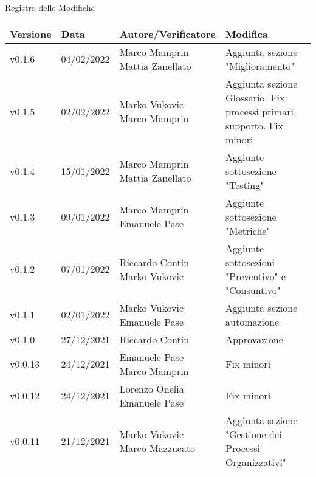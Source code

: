 \begin{center}
  \huge{Registro delle Modifiche}
\end{center}
\newcommand{\aCapo}[1]{%
  \begin{tabular}{@{}c@{}}\strut#1\strut\end{tabular}%
}

\begin{center}
  \begin{longtable}{|p{1.8cm}|p{2.2cm}|p{4.2cm}|p{4.6cm}|}
      \hline
      \textbf{Versione} & \textbf{Data} & \textbf{Autore/Verificatore} & \textbf{Modifica}                    \\ \hline
      v0.1.6            & 04/02/2022    & \aCapo{Marco Mamprin\\Mattia Zanellato} & Aggiunta sezione "Miglioramento"   \\ \hline          
      v0.1.5            & 02/02/2022    & \aCapo{Marko Vukovic\\Marco Mamprin} & Aggiunta sezione Glossario. Fix: processi primari, supporto. Fix minori   \\ \hline           
      v0.1.4            & 15/01/2022    & \aCapo{Marco Mamprin\\Mattia Zanellato} & Aggiunte sottosezione "Testing"  \\ \hline 
      v0.1.3            & 09/01/2022    & \aCapo{Marco Mamprin\\Emanuele Pase} & Aggiunte sottosezione "Metriche"  \\ \hline           
      v0.1.2            & 07/01/2022    & \aCapo{Riccardo Contin\\Marko Vukovic} & Aggiunte sottosezioni "Preventivo" e "Consuntivo"  \\ \hline
      v0.1.1            & 02/01/2022    & \aCapo{Marko Vukovic\\Emanuele Pase} & Aggiunta sezione automazione  \\ \hline
      v0.1.0            & 27/12/2021    & Riccardo Contin & Approvazione  \\ \hline
      v0.0.13           & 24/12/2021    & \aCapo{Emanuele Pase\\Marco Mamprin} & Fix minori  \\ \hline
      v0.0.12           & 24/12/2021    & \aCapo{Lorenzo Onelia\\Emanuele Pase} & Fix minori \\ \hline
      v0.0.11           & 21/12/2021    & \aCapo{Marko Vukovic\\Marco Mazzucato} & Aggiunta sezione "Gestione dei Processi Organizzativi" \\ \hline

\end{longtable}
\end{center}
